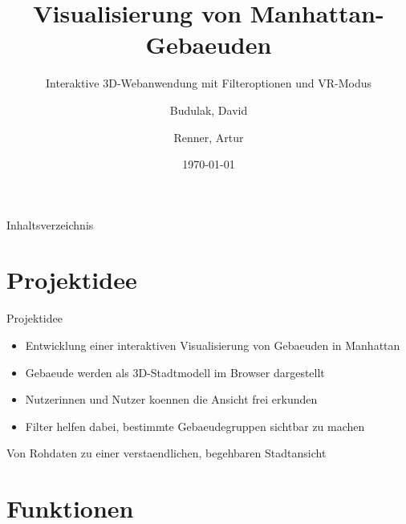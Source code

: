 \documentclass[
amberg, %
toc=fancy, %
footlinebox, %
nometaot %
]{OTHAWbeamer}
\title[Manhattan Buildings]{Visualisierung von Manhattan-Gebaeuden}
\subtitle{Interaktive 3D-Webanwendung mit Filteroptionen und VR-Modus}
\author{Budulak, David \and Renner, Artur}
\institute{OTH Amberg-Weiden}
\date{\today}
\begin{document}
    \maketitle

    \begin{frame}{Inhaltsverzeichnis}
        \tableofcontents
    \end{frame}



    \section{Projektidee}

    \begin{frame}{Projektidee}
        \begin{itemize}
            \item Entwicklung einer interaktiven Visualisierung von Gebaeuden in Manhattan
            \item Gebaeude werden als 3D-Stadtmodell im Browser dargestellt
            \item Nutzerinnen und Nutzer koennen die Ansicht frei erkunden
            \item Filter helfen dabei, bestimmte Gebaeudegruppen sichtbar zu machen
        \end{itemize}

        \vspace{0.5cm}

        \begin{center}
            \Large
            Von Rohdaten zu einer verstaendlichen, begehbaren Stadtansicht
        \end{center}
    \end{frame}

    \section{Funktionen}
\end{document}
